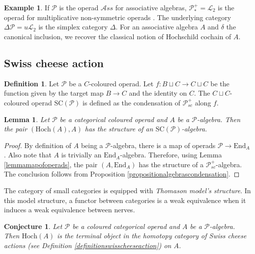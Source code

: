 \documentclass[]{amsart}
\newtheorem{lemma}[theorem]{Lemma}
\newtheorem{conjecture}[theorem]{Conjecture}
\theoremstyle{definition}
\newtheorem{definition}[theorem]{Definition}
\newtheorem{example}[theorem]{Example}
\begin{document}
\begin{example}
	If $\mathcal{P}$ is the operad $\mathcal{A}ss$ for associative algebras, $\mathcal{P}_*^+ = \mathcal{L}_2$ is the operad for multiplicative non-symmetric operads \cite{BataninBergerLattice}. The underlying category $\Delta \mathcal{P} = u \mathcal{L}_2$ is the simplex category $\Delta$. For an associative algebra $A$ and $\delta$ the canonical inclusion, we recover the classical notion of Hochschild cochain of $A$.
\end{example}

\subsection{Swiss cheese action}

\begin{definition}
	Let $\mathcal{P}$ be a $C$-coloured operad. Let $f: B \sqcup C \to C \sqcup C$ be the function given by the target map $B \to C$ and the identity on $C$. The $C \sqcup C$-coloured operad $\mathrm{SC}(\mathcal{P})$ is defined as the condensation of $\mathcal{P}_{sc}^+$ along $f$.
\end{definition}

\begin{lemma}\label{lemmaalgebra}
	Let $\mathcal{P}$ be a categorical coloured operad and $A$ be a $\mathcal{P}$-algebra. Then the pair $(\mathrm{Hoch}(A),A)$ has the structure of an $\mathrm{SC}(\mathcal{P})$-algebra.
\end{lemma}

\begin{proof}
	By definition of $A$ being a $\mathcal{P}$-algebra, there is a map of operads $\mathcal{P} \to \mathrm{End}_A$. Also note that $A$ is trivially an $\mathrm{End}_A$-algebra. Therefore, using Lemma \ref{lemmamapofoperads}, the pair $(A,\mathrm{End}_A)$ has the structure of a $\mathcal{P}_{sc}^+$-algebra. The conclusion follows from Proposition \ref{propositionalgebrascondensation}.
\end{proof}


The category of small categories is equipped with \emph{Thomason model's structure}. In this model structure, a functor between categories is a weak equivalence when it induces a weak equivalence between nerves.

\begin{conjecture}\label{conjecture}
	Let $\mathcal{P}$ be a coloured categorical operad and $A$ be a $\mathcal{P}$-algebra. Then $\mathrm{Hoch}(A)$ is the terminal object in the homotopy category of Swiss cheese actions (see Definition \ref{definitionswisscheeseaction}) on $A$.
\end{conjecture}
\end{document}
